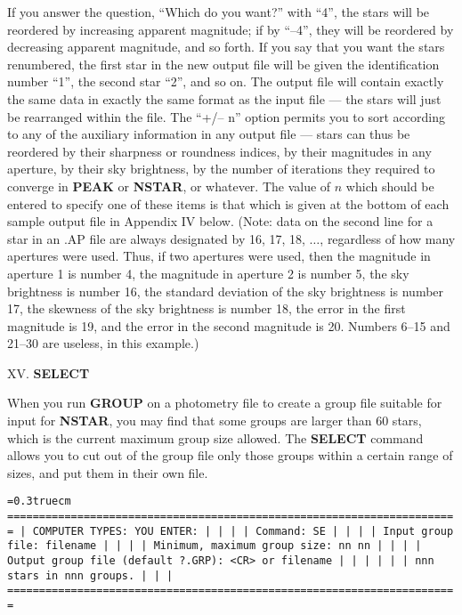 \noindent If you answer the question, ``Which do you want?'' with
``4'', the stars will be reordered by increasing apparent magnitude; if
by ``--4'', they will be reordered by decreasing apparent magnitude,
and so forth.  If you say that you want the stars renumbered, the first
star in the new output file will be given the identification number
``1'', the second star ``2'', and so on.  The output file will contain
exactly the same data in exactly the same format as the input file ---
the stars will just be rearranged within the file. The ``+/-- n''
option permits you to sort according to any of the auxiliary
information in any output file --- stars can thus be reordered by their
sharpness or roundness indices, by their magnitudes in any aperture, by
their sky brightness, by the number of iterations they required to
converge in {\bf PEAK} or {\bf NSTAR}, or whatever.  The value of $n$
which should be entered to specify one of these items is that which is
given at the bottom of each sample output file in Appendix IV below.
(Note:  data on the second line for a star in an .AP file are always
designated by 16, 17, 18, $\ldots$, regardless of how many apertures
were used.  Thus, if two apertures were used, then the magnitude in
aperture 1 is number 4, the magnitude in aperture 2 is number 5, the
sky brightness is number 16, the standard deviation of the sky
brightness is number 17, the skewness of the sky brightness is number
18, the error in the first magnitude is 19, and the error in the second
magnitude is 20.  Numbers 6--15 and 21--30 are useless, in this
example.)

\vfill
\eject
\noindent XV.  {\bf SELECT}

When you run {\bf GROUP} on a photometry file to create a group file
suitable for input for {\bf NSTAR}, you may find that some groups are
larger than 60 stars, which is the current maximum group size allowed.
The {\bf SELECT} command allows you to cut out of the group file only
those groups within a certain range of sizes, and put them in their own
file.

\bigskip
{\noindent\obeylines\obeyspaces\frenchspacing\tt\baselineskip=0.3truecm
=======================================================================
| COMPUTER TYPES:                                  YOU ENTER:         |
|                                                                     |
| Command:                                         SE                 |
|                                                                     |
|                     Input group file:            filename           |
|                                                                     |
|          Minimum, maximum group size:            nn nn              |
|                                                                     |
|    Output group file (default ?.GRP):            <CR> or filename   |
|                                                                     |
|                                                                     |
|          nnn stars in nnn groups.                                   |
|                                                                     |
=======================================================================
}
\bigskip

